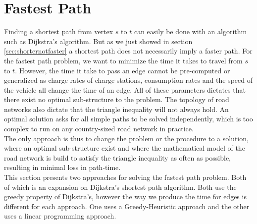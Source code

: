 \section{Fastest Path}
Finding a shortest path from vertex $s$ to $t$ can easily be done with an algorithm such as Dijkstra's algorithm. But as we just showed in section \ref{sec:shorternotfaster} a shortest path does not necessarily imply a faster path. For the fastest path problem, we want to minimize the time it takes to travel from $s$ to $t$. However, the time it take to pass an edge cannot be pre-computed or generalized as charge rates of charge stations, consumption rates and the speed of the vehicle all change the time of an edge. All of these parameters dictates that there exist no optimal sub-structure to the problem. The topology of road networks also dictate that the triangle inequality will not always hold. An optimal solution asks for all simple paths to be solved independently, which is too complex to run on any country-sized road network in practice.\\
The only approach is thus to change the problem or the procedure to a solution, where an optimal sub-structure exist and where the mathematical model of the road network is build to satisfy the triangle inequality as often as possible, resulting in minimal loss in path-time.\\

This section presents two approaches for solving the fastest path problem. Both of which is an expansion on Dijkstra's shortest path algorithm. Both use the greedy property of Dijkstra's, however the way we produce the time for edges is different for each approach. One uses a Greedy-Heuristic approach and the other uses a linear programming approach.